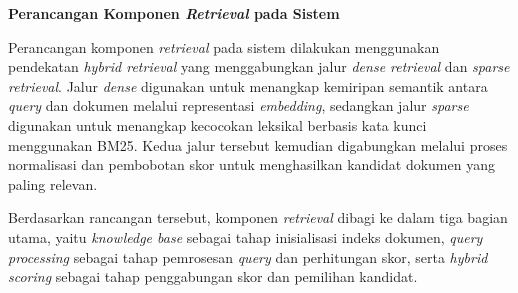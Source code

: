 \documentclass[12pt,a4paper]{article}
\begin{document}
\textbf{Perancangan Komponen \textit{Retrieval} pada Sistem}

Perancangan komponen \textit{retrieval} pada sistem dilakukan menggunakan pendekatan \textit{hybrid retrieval} yang menggabungkan jalur \textit{dense retrieval} dan \textit{sparse retrieval}. Jalur \textit{dense} digunakan untuk menangkap kemiripan semantik antara \textit{query} dan dokumen melalui representasi \textit{embedding}, sedangkan jalur \textit{sparse} digunakan untuk menangkap kecocokan leksikal berbasis kata kunci menggunakan BM25. Kedua jalur tersebut kemudian digabungkan melalui proses normalisasi dan pembobotan skor untuk menghasilkan kandidat dokumen yang paling relevan.

Berdasarkan rancangan tersebut, komponen \textit{retrieval} dibagi ke dalam tiga bagian utama, yaitu \textit{knowledge base} sebagai tahap inisialisasi indeks dokumen, \textit{query processing} sebagai tahap pemrosesan \textit{query} dan perhitungan skor, serta \textit{hybrid scoring} sebagai tahap penggabungan skor dan pemilihan kandidat.
\end{document}
